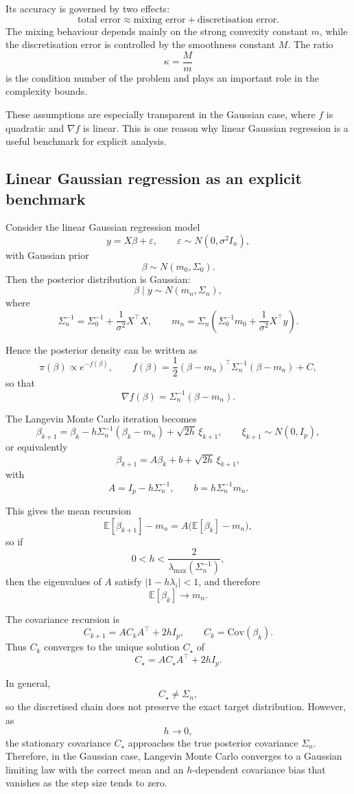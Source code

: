 \documentclass[a4paper,11pt, titlepage]{article}
\theoremstyle{definition}
\theoremstyle{plain}
\theoremstyle{remark}
\begin{document}
Its accuracy is governed by two effects:
\[
\text{total error}
\approx
\text{mixing error}+\text{discretisation error}.
\]
The mixing behaviour depends mainly on the strong convexity constant $m$, while the discretisation error is controlled by the smoothness constant $M$. The ratio
\[
\kappa=\frac{M}{m}
\]
is the condition number of the problem and plays an important role in the complexity bounds.

These assumptions are especially transparent in the Gaussian case, where $f$ is quadratic and $\nabla f$ is linear. This is one reason why linear Gaussian regression is a useful benchmark for explicit analysis.

\subsection{Linear Gaussian regression as an explicit benchmark}
\label{sec:theory-linear-gaussian}

Consider the linear Gaussian regression model
\[
y=X\beta+\varepsilon,
\qquad
\varepsilon\sim N(0,\sigma^2 I_n),
\]
with Gaussian prior
\[
\beta\sim N(m_0,\Sigma_0).
\]
Then the posterior distribution is Gaussian:
\[
\beta\mid y \sim N(m_n,\Sigma_n),
\]
where
\[
\Sigma_n^{-1}=\Sigma_0^{-1}+\frac{1}{\sigma^2}X^\top X,
\qquad
m_n=\Sigma_n\left(\Sigma_0^{-1}m_0+\frac{1}{\sigma^2}X^\top y\right).
\]

Hence the posterior density can be written as
\[
\pi(\beta)\propto e^{-f(\beta)},
\qquad
f(\beta)=\frac12(\beta-m_n)^\top \Sigma_n^{-1}(\beta-m_n)+C,
\]
so that
\[
\nabla f(\beta)=\Sigma_n^{-1}(\beta-m_n).
\]

The Langevin Monte Carlo iteration becomes
\[
\beta_{k+1}
=
\beta_k-h\Sigma_n^{-1}(\beta_k-m_n)+\sqrt{2h}\,\xi_{k+1},
\qquad
\xi_{k+1}\sim N(0,I_p),
\]
or equivalently
\[
\beta_{k+1}=A\beta_k+b+\sqrt{2h}\,\xi_{k+1},
\]
with
\[
A=I_p-h\Sigma_n^{-1},
\qquad
b=h\Sigma_n^{-1}m_n.
\]

This gives the mean recursion
\[
\mathbb E[\beta_{k+1}]-m_n
=
A\bigl(\mathbb E[\beta_k]-m_n\bigr),
\]
so if
\[
0<h<\frac{2}{\lambda_{\max}(\Sigma_n^{-1})},
\]
then the eigenvalues of $A$ satisfy $|1-h\lambda_i|<1$, and therefore
\[
\mathbb E[\beta_k]\to m_n.
\]

The covariance recursion is
\[
C_{k+1}=A C_k A^\top +2hI_p,
\qquad
C_k=\mathrm{Cov}(\beta_k).
\]
Thus $C_k$ converges to the unique solution $C_\star$ of
\[
C_\star=A C_\star A^\top +2hI_p.
\]

In general,
\[
C_\star\neq \Sigma_n,
\]
so the discretised chain does not preserve the exact target distribution. However, as
\[
h\to 0,
\]
the stationary covariance $C_\star$ approaches the true posterior covariance $\Sigma_n$. Therefore, in the Gaussian case, Langevin Monte Carlo converges to a Gaussian limiting law with the correct mean and an $h$-dependent covariance bias that vanishes as the step size tends to zero.
\end{document}

